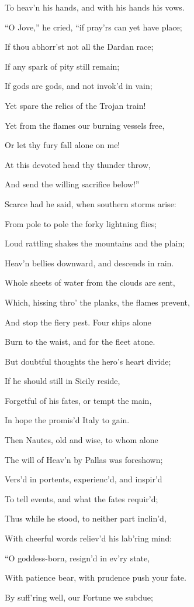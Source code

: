 To heav’n his hands, and with his hands his vows.

“O Jove,” he cried, “if pray’rs can yet have place;

If thou abhorr’st not all the Dardan race;

If any spark of pity still remain;

If gods are gods, and not invok’d in vain;

Yet spare the relics of the Trojan train!

Yet from the flames our burning vessels free,

Or let thy fury fall alone on me!

At this devoted head thy thunder throw,

And send the willing sacrifice below!”

Scarce had he said, when southern storms arise:

From pole to pole the forky lightning flies;

Loud rattling shakes the mountains and the plain;

Heav’n bellies downward, and descends in rain.

Whole sheets of water from the clouds are sent,

Which, hissing thro’ the planks, the flames prevent,

And stop the fiery pest. Four ships alone

Burn to the waist, and for the fleet atone.

But doubtful thoughts the hero’s heart divide;

If he should still in Sicily reside,

Forgetful of his fates, or tempt the main,

In hope the promis’d Italy to gain.

Then Nautes, old and wise, to whom alone

The will of Heav’n by Pallas was foreshown;

Vers’d in portents, experienc’d, and inspir’d

To tell events, and what the fates requir’d;

Thus while he stood, to neither part inclin’d,

With cheerful words reliev’d his lab’ring mind:

“O goddess-born, resign’d in ev’ry state,

With patience bear, with prudence push your fate.

By suff’ring well, our Fortune we subdue;

